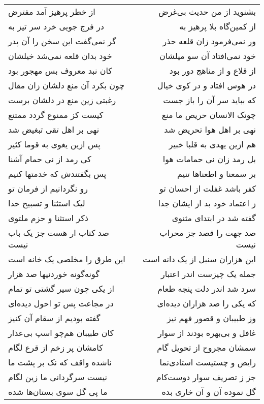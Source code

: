\begin{center}
\begin{longtable}{l p{0.5cm} r}
\\
از خطر پرهیز آمد مفترض
&&
بشنوید از من حدیث بی‌غرض
\\
در فرج جویی خرد سر تیز به
&&
از کمین‌گاه بلا پرهیز به
\\
گر نمی‌گفت این سخن را آن پدر
&&
ور نمی‌فرمود زان قلعه حذر
\\
خود بدان قلعه نمی‌شد خیلشان
&&
خود نمی‌افتاد آن سو میلشان
\\
کان نبد معروف بس مهجور بود
&&
از قلاع و از مناهج دور بود
\\
چون بکرد آن منع دلشان زان مقال
&&
در هوس افتاد و در کوی خیال
\\
رغبتی زین منع در دلشان برست
&&
که بباید سر آن را باز جست
\\
کیست کز ممنوع گردد ممتنع
&&
چونک الانسان حریص ما منع
\\
نهی بر اهل تقی تبغیض شد
&&
نهی بر اهل هوا تحریض شد
\\
پس ازین یغوی به قوما کثیر
&&
هم ازین یهدی به قلبا خبیر
\\
کی رمد از نی حمام آشنا
&&
بل رمد زان نی حمامات هوا
\\
پس بگفتندش که خدمتها کنیم
&&
بر سمعنا و اطعناها تنیم
\\
رو نگردانیم از فرمان تو
&&
کفر باشد غفلت از احسان تو
\\
لیک استثنا و تسبیح خدا
&&
ز اعتماد خود بد از ایشان جدا
\\
ذکر استثنا و حزم ملتوی
&&
گفته شد در ابتدای مثنوی
\\
صد کتاب ار هست جز یک باب نیست
&&
صد جهت را قصد جز محراب نیست
\\
این طرق را مخلصی یک خانه است
&&
این هزاران سنبل از یک دانه است
\\
گونه‌گونه خوردنیها صد هزار
&&
جمله یک چیزست اندر اعتبار
\\
از یکی چون سیر گشتی تو تمام
&&
سرد شد اندر دلت پنجه طعام
\\
در مجاعت پس تو احول دیده‌ای
&&
که یکی را صد هزاران دیده‌ای
\\
گفته بودیم از سقام آن کنیز
&&
وز طبیبان و قصور فهم نیز
\\
کان طبیبان هم‌چو اسپ بی‌عذار
&&
غافل و بی‌بهره بودند از سوار
\\
کامشان پر زخم از قرع لگام
&&
سمشان مجروح از تحویل گام
\\
ناشده واقف که نک بر پشت ما
&&
رایض و چستیست استادی‌نما
\\
نیست سرگردانی ما زین لگام
&&
جز ز تصریف سوار دوست‌کام
\\
ما پی گل سوی بستان‌ها شده
&&
گل نموده آن و آن خاری بده
\\

\end{longtable}
\end{center}
